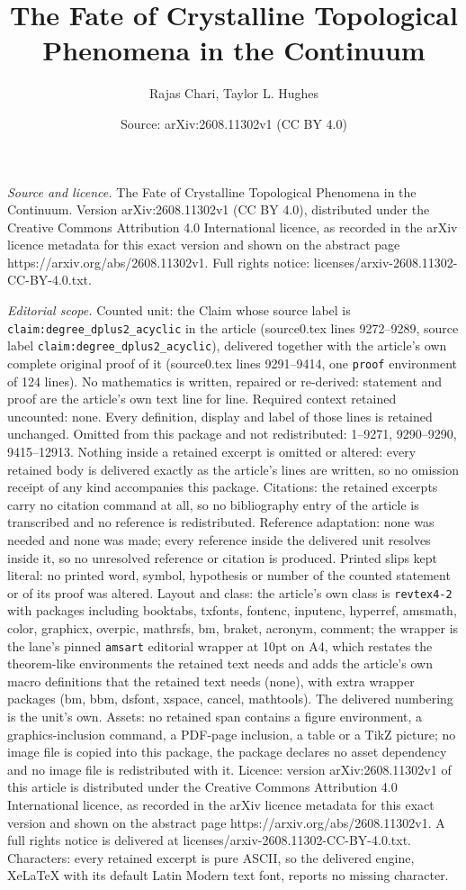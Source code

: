 \documentclass[10pt,a4paper]{amsart}
\title[The Fate of Crystalline Topological Phenomena in the Continu]{The Fate of Crystalline Topological Phenomena in the Continuum}
\author{Rajas Chari, Taylor L. Hughes}
\date{Source: arXiv:2608.11302v1 (CC BY 4.0)}
\begin{document}
\maketitle

\noindent\emph{Source and licence.} The Fate of Crystalline Topological Phenomena in the Continuum. Version arXiv:2608.11302v1 (CC BY 4.0), distributed under the Creative Commons Attribution 4.0 International licence, as recorded in the arXiv licence metadata for this exact version and shown on the abstract page https://arxiv.org/abs/2608.11302v1. Full rights notice: licenses/arxiv-2608.11302-CC-BY-4.0.txt.\par\smallskip

\noindent\textit{Editorial scope.} Counted unit: the Claim whose source label is \texttt{claim:degree\_dplus2\_acyclic} in the article (source0.tex lines 9272--9289, source label \texttt{claim:degree\_dplus2\_acyclic}), delivered together with the article's own complete original proof of it (source0.tex lines 9291--9414, one \texttt{proof} environment of 124 lines). No mathematics is written, repaired or re-derived: statement and proof are the article's own text line for line. Required context retained uncounted: none. Every definition, display and label of those lines is retained unchanged. Omitted from this package and not redistributed: 1--9271, 9290--9290, 9415--12913. Nothing inside a retained excerpt is omitted or altered: every retained body is delivered exactly as the article's lines are written, so no omission receipt of any kind accompanies this package. Citations: the retained excerpts carry no citation command at all, so no bibliography entry of the article is transcribed and no reference is redistributed. Reference adaptation: none was needed and none was made; every reference inside the delivered unit resolves inside it, so no unresolved reference or citation is produced. Printed slips kept literal: no printed word, symbol, hypothesis or number of the counted statement or of its proof was altered. Layout and class: the article's own class is \texttt{revtex4-2} with packages including booktabs, txfonts, fontenc, inputenc, hyperref, amsmath, color, graphicx, overpic, mathrsfs, bm, braket, acronym, comment; the wrapper is the lane's pinned \texttt{amsart} editorial wrapper at 10pt on A4, which restates the theorem-like environments the retained text needs and adds the article's own macro definitions that the retained text needs (none), with extra wrapper packages (bm, bbm, dsfont, xspace, cancel, mathtools). The delivered numbering is the unit's own. Assets: no retained span contains a figure environment, a graphics-inclusion command, a PDF-page inclusion, a table or a TikZ picture; no image file is copied into this package, the package declares no asset dependency and no image file is redistributed with it. Licence: version arXiv:2608.11302v1 of this article is distributed under the Creative Commons Attribution 4.0 International licence, as recorded in the arXiv licence metadata for this exact version and shown on the abstract page https://arxiv.org/abs/2608.11302v1. A full rights notice is delivered at licenses/arxiv-2608.11302-CC-BY-4.0.txt. Characters: every retained excerpt is pure ASCII, so the delivered engine, XeLaTeX with its default Latin Modern text font, reports no missing character.
\end{document}
